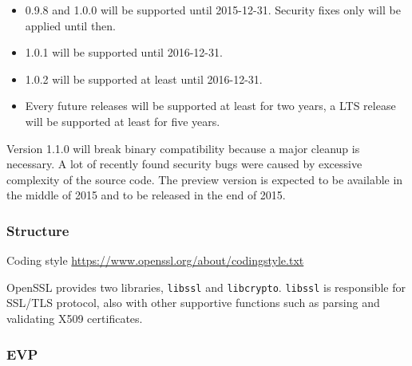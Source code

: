 \begin{itemize}
  \item 0.9.8 and 1.0.0 will be supported until 2015-12-31. Security fixes only will be applied until then.
  \item 1.0.1 will be supported until 2016-12-31.
  \item 1.0.2 will be supported at least until 2016-12-31.
  \item Every future releases will be supported at least for two years, a LTS release will be supported at least for five years.
\end{itemize}

Version 1.1.0 will break binary compatibility because a major cleanup is necessary. A lot of recently found security bugs were caused by excessive complexity of the source code. The preview version is expected to be available in the middle of 2015 and to be released in the end of 2015.

\subsubsection{Structure}


Coding style \url{https://www.openssl.org/about/codingstyle.txt}

OpenSSL provides two libraries, \texttt{libssl} and \texttt{libcrypto}. \texttt{libssl} is responsible for SSL/TLS protocol, also with other supportive functions such as parsing and validating X509 certificates.

\subsubsection{EVP}
